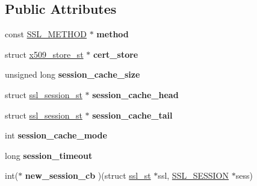 \subsection*{Public Attributes}
\begin{DoxyCompactItemize}
\item 
\mbox{\label{structssl__ctx__st_a9e4773d3ec5b1a80abab92390015c576}} 
const \hyperlink{structssl__method__st}{S\+S\+L\+\_\+\+M\+E\+T\+H\+OD} $\ast$ {\bfseries method}
\item 
\mbox{\label{structssl__ctx__st_a8b6658b3bc3acb20908f2541056e3949}} 
struct \hyperlink{structx509__store__st}{x509\+\_\+store\+\_\+st} $\ast$ {\bfseries cert\+\_\+store}
\item 
\mbox{\label{structssl__ctx__st_af715c6f8caa8c192423ad5abfa211e6e}} 
unsigned long {\bfseries session\+\_\+cache\+\_\+size}
\item 
\mbox{\label{structssl__ctx__st_a3683adb75792a407eee86f042a7c7c68}} 
struct \hyperlink{structssl__session__st}{ssl\+\_\+session\+\_\+st} $\ast$ {\bfseries session\+\_\+cache\+\_\+head}
\item 
\mbox{\label{structssl__ctx__st_a1524f4319d24d011a575b8e9a70a0065}} 
struct \hyperlink{structssl__session__st}{ssl\+\_\+session\+\_\+st} $\ast$ {\bfseries session\+\_\+cache\+\_\+tail}
\item 
\mbox{\label{structssl__ctx__st_a957af083f0d87b4347e29788bd7e00e5}} 
int {\bfseries session\+\_\+cache\+\_\+mode}
\item 
\mbox{\label{structssl__ctx__st_a7b165f0e9fbde0499dedb660cdf0d756}} 
long {\bfseries session\+\_\+timeout}
\item 
\mbox{\label{structssl__ctx__st_a114da734a32555bec7ac1543e7fcef11}} 
int($\ast$ {\bfseries new\+\_\+session\+\_\+cb} )(struct \hyperlink{structssl__st}{ssl\+\_\+st} $\ast$ssl, \hyperlink{structssl__session__st}{S\+S\+L\+\_\+\+S\+E\+S\+S\+I\+ON} $\ast$sess)
\item 
\mbox{\label{structssl__ctx__st_a52d5ac51adc42ec8253a089cbc25afcc}} 

\end{DoxyCompactItemize}
